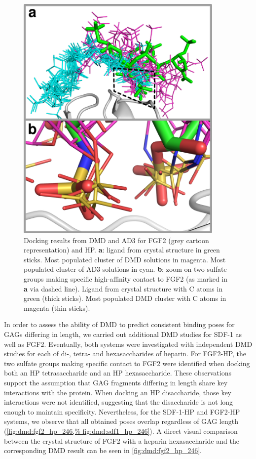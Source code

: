 \begin{figure}
\centering
\includegraphics[width=0.9\textwidth]{gfx/dmd/fgf2_topclusters_dmd_vs_ad3_receptorribbon_normal_and_zoom_jcc_004.png}
\caption[]{
Docking results from DMD and AD3 for FGF2 (grey cartoon representation) and HP.
\textbf{a}: ligand from crystal structure in green sticks. Most populated
cluster of DMD solutions in magenta. Most populated cluster of AD3 solutions in
cyan. \textbf{b}: zoom on two sulfate groups making specific high-affinity
contact to FGF2 \cite{faham_heparin_1996} (as marked in \textbf{a} via dashed
line). Ligand from crystal structure with C atoms in green (thick sticks). Most
populated DMD cluster with C atoms in magenta (thin sticks).
}
\label{fig:dmd:fgf2zoom}
\end{figure}


In order to assess the ability of DMD to predict consistent binding poses for
GAGs differing in length, we carried out additional DMD studies for SDF-1 as
well as FGF2. Eventually, both systems were investigated with independent DMD
studies for each of di-, tetra- and hexasaccharides of heparin. For FGF2-HP, the
two sulfate groups making specific contact to FGF2 were identified when docking
both an HP tetrasaccharide and an HP hexasaccharide. These observations support
the assumption that GAG fragments differing in length share key interactions
with the protein. When docking an HP disaccharide, those key interactions were
not identified, suggesting that the disaccharide is not long enough to maintain
specificity. Nevertheless, for the SDF-1-HP and FGF2-HP systems, we observe that
all obtained poses overlap regardless of GAG length (\cref{fig:dmd:fgf2_hp_246,%
fig:dmd:sdf1_hp_246}).  A direct visual comparison between the crystal structure
of FGF2 with a heparin hexasaccharide{\cite{faham_heparin_1996}} and the
corresponding DMD result can be seen in \cref{fig:dmd:fgf2_hp_246}.


